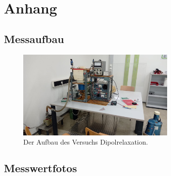 \newpage
\section{Anhang}


\subsection{Messaufbau}



\begin{figure}[h]
    \centering
    \includegraphics[width=0.7\textwidth]{latex/images/Aufbau.jpeg}
    \caption{Der Aufbau des Versuchs Dipolrelaxation.}
\end{figure}
%


\subsection{Messwertfotos}

